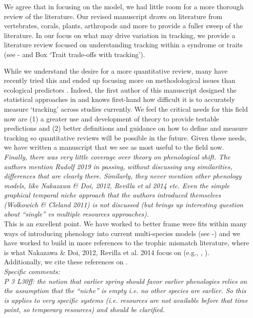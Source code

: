 \documentclass[11pt]{article}
\begin{document}
We agree that in focusing on the model, we had little room for a more thorough review of the literature. Our revised manuscript draws on literature from vertebrates, corals, plants, arthropods and more to provide a fuller sweep of the literature. In our focus on what may drive variation in tracking, we provide a literature review focused on understanding tracking within a syndrome or traits (see - and Box `Trait trade-offs with tracking'). 

While we understand the desire for a more quantitative review, many have recently tried this and ended up focusing more on methodological issues than ecological predictors \citep[][]{brown2016,kharouba2018}. Indeed, the first author of this manuscript designed the statistical approaches in \citet{kharouba2018} and knows first-hand how difficult it is to accurately measure `tracking' across studies currently. We feel the critical needs for this field now are (1) a greater use and development of theory to provide testable predictions and (2) better definitions and guidance on how to define and measure tracking so quantitative reviews will be possible in the future. Given these needs, we have written a manuscript that we see as most useful to the field now. \\ 

\emph{Finally, there was very little coverage over theory on phenological shift. The authors
mention Rudolf 2019 in passing, without discussing any similarities, differences that are
clearly there. Similarly, they never mention other phenology models, like Nakazawa \& Doi,
2012, Revilla et al 2014 etc. Even the simple graphical temporal niche approach that the
authors introduced themselves (Wolkowich \& Cleland 2011) is not discussed (but brings up
interesting question about ``single'' vs multiple resources approaches).}\\

This is an excellent point. We have worked to better frame were \citet{volkerass} fits within many ways of introducing phenology into current multi-species models (see -) and we have worked to build in more references to the trophic mismatch literature, where is what Nakazawa \& Doi, 2012, Revilla et al. 2014 focus on (e.g., , ). Additionally, we cite these references on .\\

\emph{Specific comments:\\
P 3 L30ff: the notion that earlier spring should favor earlier phenologies relies on the
assumption that the ``niche'' is empty i.e. no other species are earlier. So this is applies to
very specific systems (i.e. resources are not available before that time point, so temporary
resources) and should be clarified.}\\
\end{document}
